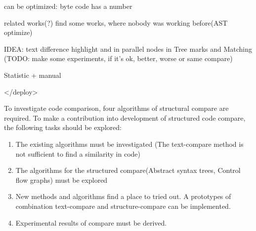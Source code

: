 can be optimized: byte code has a number

related works(?)
find some works, where nobody was working before(AST optimize)

IDEA: text difference highlight and in parallel nodes in Tree marks and Matching
(TODO: make some experiments, if it's ok, better, worse or same compare)

Statistic + manual
	
</deploy>

To investigate code comparison, four algorithms of structural compare are required.
To make a contribution into development of structured code compare, the following tasks should be explored:

\begin{enumerate}
  \item The existing algorithms must be investigated (The text-compare method is not sufficient to find a similarity in code)
  \item The algorithms for the structured compare(Abstract syntax trees, Control flow graphs) must be explored 
   \item New methods and algorithms find a place to tried out. A prototypes of combination text-compare and structure-compare can be implemented.
   \item Experimental results of compare must be derived.
\end{enumerate}


